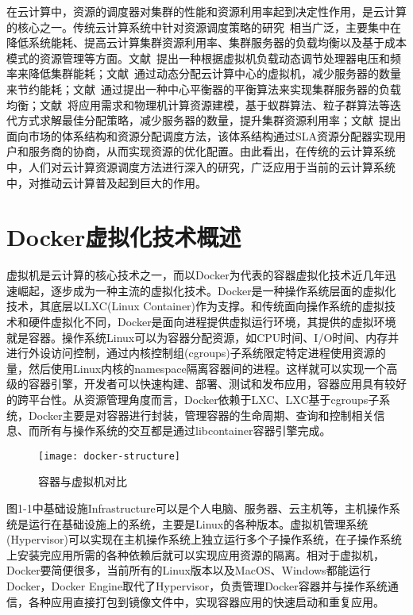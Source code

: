 在云计算中，资源的调度器对集群的性能和资源利用率起到决定性作用，是云计算的核心之一。传统云计算系统中针对资源调度策略的研究~\cite{CloudSummarize}相当广泛，主要集中在降低系统能耗、提高云计算集群资源利用率、集群服务器的负载均衡以及基于成本模式的资源管理等方面。文献~提出一种根据虚拟机负载动态调节处理器电压和频率来降低集群能耗；文献~通过动态分配云计算中心的虚拟机，减少服务器的数量来节约能耗；文献~通过提出一种中心平衡器的平衡算法来实现集群服务器的负载均衡；文献~将应用需求和物理机计算资源建模，基于蚁群算法、粒子群算法等迭代方式求解最佳分配策略，减少服务器的数量，提升集群资源利用率；文献~提出面向市场的体系结构和资源分配调度方法，该体系结构通过SLA资源分配器实现用户和服务商的协商，从而实现资源的优化配置。由此看出，在传统的云计算系统中，人们对云计算资源调度方法进行深入的研究，广泛应用于当前的云计算系统中，对推动云计算普及起到巨大的作用。

\section{Docker虚拟化技术概述}
虚拟机是云计算的核心技术之一，而以Docker为代表的容器虚拟化技术近几年迅速崛起，逐步成为一种主流的虚拟化技术。Docker是一种操作系统层面的虚拟化技术，其底层以LXC(Linux Container)作为支撑。和传统面向操作系统的虚拟技术和硬件虚拟化不同，Docker是面向进程提供虚拟运行环境，其提供的虚拟环境就是容器。操作系统Linux可以为容器分配资源，如CPU时间、I/O时间、内存并进行外设访问控制，通过内核控制组(cgroups)子系统限定特定进程使用资源的量，然后使用Linux内核的namespace隔离容器间的进程。这样就可以实现一个高级的容器引擎，开发者可以快速构建、部署、测试和发布应用，容器应用具有较好的跨平台性。从资源管理角度而言，Docker依赖于LXC、LXC基于cgroups子系统，Docker主要是对容器进行封装，管理容器的生命周期、查询和控制相关信息、而所有与操作系统的交互都是通过libcontainer容器引擎完成。
\begin{figure}[H] %
	\centering
	\texttt{[image: docker-structure]}
	\caption{容器与虚拟机对比}
\end{figure}
图1-1中基础设施Infrastructure可以是个人电脑、服务器、云主机等，主机操作系统是运行在基础设施上的系统，主要是Linux的各种版本。虚拟机管理系统(Hypervisor)可以实现在主机操作系统上独立运行多个子操作系统，在子操作系统上安装完应用所需的各种依赖后就可以实现应用资源的隔离。相对于虚拟机，Docker要简便很多，当前所有的Linux版本以及MacOS、Windows都能运行Docker，Docker Engine取代了Hypervisor，负责管理Docker容器并与操作系统通信，各种应用直接打包到镜像文件中，实现容器应用的快速启动和重复应用。

